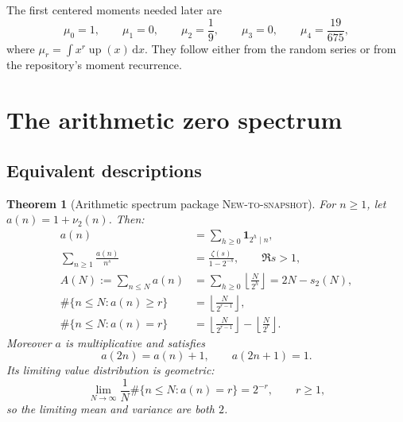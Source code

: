 \documentclass[11pt,oneside]{article}
\numberwithin{equation}{section}
\newtheorem{theorem}{Theorem}[section]
\theoremstyle{definition}
\theoremstyle{remark}
\newcommand{\dd}{\,\mathrm d}
\newcommand{\Up}{\operatorname{up}}
\newcommand{\floor}[1]{\left\lfloor #1\right\rfloor}
\newcommand{\NewResult}{\textsc{New-to-snapshot}}
\begin{document}
The first centered moments needed later are
\begin{equation}
 \mu_0=1,\qquad \mu_1=0,\qquad \mu_2=\frac19,
 \qquad \mu_3=0,\qquad \mu_4=\frac{19}{675},               \label{eq:moments}
\end{equation}
where $\mu_r=\int x^r\Up(x)\dd x$.  They follow either from the random series or
from the repository's moment recurrence.

\section{The arithmetic zero spectrum}
\label{sec:spectrum}

\subsection{Equivalent descriptions}

\begin{theorem}[Arithmetic spectrum package \NewResult]
\label{thm:spectrum-package}
For $n\ge1$, let $a(n)=1+\nu_2(n)$.  Then:
\begin{align}
 a(n)&=\sum_{h\ge0}\mathbf 1_{2^h\mid n},                  \label{eq:a-divisor}\\
 \sum_{n\ge1}\frac{a(n)}{n^s}
   &=\frac{\zeta(s)}{1-2^{-s}},\qquad \Re s>1,             \label{eq:D}\\
 A(N):=\sum_{n\le N}a(n)
   &=\sum_{h\ge0}\floor{\frac{N}{2^h}}
     =2N-s_2(N),                                           \label{eq:AN}\\
 \#\{n\le N:a(n)\ge r\}
   &=\floor{\frac{N}{2^{r-1}}},                            \label{eq:tail-count}\\
 \#\{n\le N:a(n)=r\}
   &=\floor{\frac{N}{2^{r-1}}}-
     \floor{\frac{N}{2^r}}.                               \label{eq:exact-count}
\end{align}
Moreover $a$ is multiplicative and satisfies
\begin{equation}
 a(2n)=a(n)+1,\qquad a(2n+1)=1.                            \label{eq:a-rec}
\end{equation}
Its limiting value distribution is geometric:
\begin{equation}
 \lim_{N\to\infty}\frac1N\#\{n\le N:a(n)=r\}=2^{-r},
 \qquad r\ge1,                                            \label{eq:geom}
\end{equation}
so the limiting mean and variance are both $2$.
\end{theorem}
\end{document}
